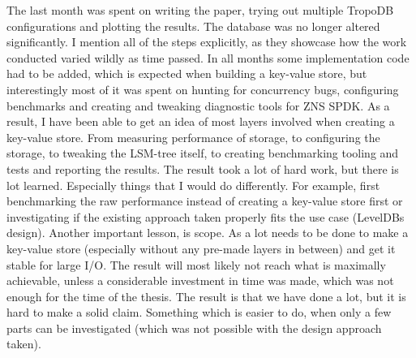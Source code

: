 The last month was spent on writing the paper, trying out multiple TropoDB configurations and plotting the results. The database was no longer altered significantly. I mention all of the steps explicitly, as they showcase how the work conducted varied wildly as time passed. In all months some implementation code had to be added, which is expected when building a key-value store, but interestingly most of it was spent on hunting for concurrency bugs, configuring benchmarks and creating and tweaking diagnostic tools for ZNS SPDK. As a result, I have been able to get an idea of most layers involved when creating a key-value store. From measuring performance of storage, to configuring the storage, to tweaking the LSM-tree itself, to creating benchmarking tooling and tests and reporting the results. The result took a lot of hard work, but there is lot learned. Especially things that I would do differently. For example, first benchmarking the raw performance instead of creating a key-value store first or investigating if the existing approach taken properly fits the use case (LevelDBs design). Another important lesson, is scope. As a lot needs to be done to make a key-value store (especially without any pre-made layers in between) and get it stable for large I/O. The result will most likely not reach what is maximally achievable, unless a considerable investment in time was made, which was not enough for the time of the thesis. The result is that we have done a lot, but it is hard to make a solid claim. Something which is easier to do, when only a few parts can be investigated (which was not possible with the design approach taken).